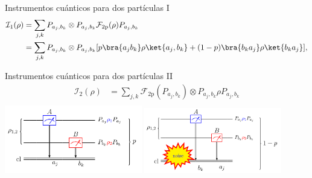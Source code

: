 \documentclass[svgnames,12pt,aspectratio=149]{beamer}
\begin{document}
\begin{frame}{Instrumentos cuánticos para dos partículas I}
  \begin{equation*}\label{eq:fisrtinstrument2p}
    \begin{split}
        \mathcal{I}_1{(\rho)}&=\sum_{j,k}P_{a_j,b_k}\otimes P_{a_j,b_k} \mathcal{F}_{2\text{p}}(\rho) P_{a_j,b_k}\\
        &=\sum_{j,k}P_{a_j,b_k}\otimes P_{a_j,b_k} [p \bra{a_j b_k}\rho \ket{a_j,b_k}+(1-p)\bra{b_k a_j }\rho \ket {b_k a_j}],
\end{split}
\end{equation*}
\begin{figure}[H]
\centering
{}
\caption*{}
\end{figure} 




\end{frame}

\begin{frame}{Instrumentos cuánticos para dos partículas II}
  \begin{equation*}\label{eq:second-instrument-2p}
    \begin{split}
        \mathcal{I}_2(\rho)&=\sum_{j,k}\mathcal{F}_{2\text{p}}(P_{a_j,b_k})\otimes P_{a_j,b_k} \rho P_{a_j,b_k}\\
    \end{split}
\end{equation*} 
\includegraphics[width=60mm]{images/fmideaqi.png}\hfill
\includegraphics[width=60mm]{images/fmqi2.png}

\end{frame}
\end{document}
